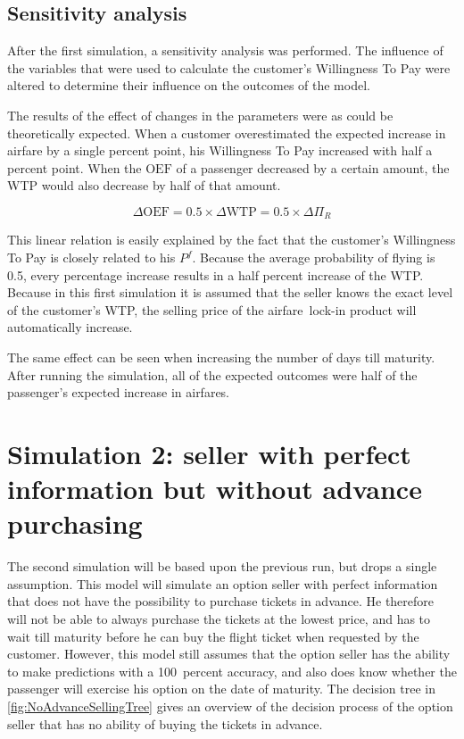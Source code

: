 \subsection{Sensitivity analysis}
After the first simulation, a sensitivity analysis was performed. The influence of the variables that were used to calculate the customer's Willingness To Pay were altered to determine their influence on the outcomes of the model.

The results of the effect of changes in the parameters were as could be theoretically expected. When a customer overestimated the expected increase in airfare by a single percent point, his Willingness To Pay increased with half a percent point. When the $\mbox{OEF}$ of a passenger decreased by a certain amount, the WTP would also decrease by half of that amount. 

$$ \Delta{\mbox{OEF}} = 0.5 \times \Delta{\mbox{WTP}} = 0.5 \times \Delta{\Pi_R} $$

This linear relation is easily explained by the fact that the customer's Willingness To Pay is closely related to his $P^f$. Because the average probability of flying is 0.5, every percentage increase results in a half percent increase of the WTP. Because in this first simulation it is assumed that the seller knows the exact level of the customer's WTP, the selling price of the airfare~lock-in product will automatically increase.

The same effect can be seen when increasing the number of days till maturity. After running the simulation, all of the expected outcomes were half of the passenger's expected increase in airfares.


\section{Simulation 2: seller with perfect information but without advance purchasing}
The second simulation will be based upon the previous run, but drops a single assumption. This model will simulate an option seller with perfect information that does not have the possibility to purchase tickets in advance. He therefore will not be able to always purchase the tickets at the lowest price, and has to wait till maturity before he can buy the flight ticket when requested by the customer. However, this model still assumes that the option seller has the ability to make predictions with a 100~percent accuracy, and also does know whether the passenger will exercise his option on the date of maturity. The decision tree in \autoref{fig:NoAdvanceSellingTree} gives an overview of the decision process of the option seller that has no ability of buying the tickets in advance.

